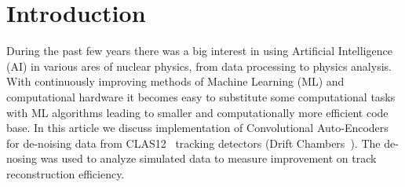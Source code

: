 \section{Introduction}

During the past few years there was a big interest in using Artificial Intelligence (AI) in 
various ares of nuclear physics, from data processing to physics analysis. With continuously 
improving methods of Machine Learning (ML) and computational hardware it becomes easy to 
substitute some computational tasks with ML algorithms leading to smaller and computationally
more efficient code base. In this article we discuss implementation of Convolutional Auto-Encoders 
for de-noising data from CLAS12~\cite{Burkert:2020akg} tracking detectors (Drift 
Chambers~\cite{Mestayer:2020saf}). The de-nosing was used to analyze simulated data to measure
improvement on track reconstruction efficiency.

